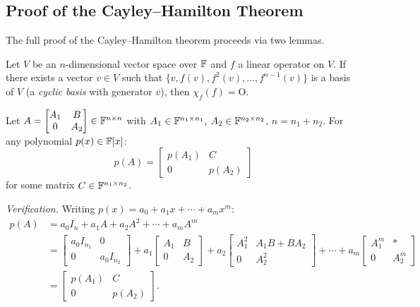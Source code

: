 \subsection{Proof of the Cayley--Hamilton Theorem}

The full proof of the Cayley--Hamilton theorem proceeds via two lemmas.

\begin{thmbox}
\label{lem:cyclic-basis-ch}
Let $V$ be an $n$-dimensional vector space over $\mathbb{F}$ and $f$ a linear
operator on $V$.  If there exists a vector $v\in V$ such that
$\{v, f(v), f^2(v), \ldots, f^{n-1}(v)\}$ is a basis of $V$
(a \emph{cyclic basis} with generator $v$), then $\chi_f(f)=\mathrm{O}$.
\end{thmbox}

\begin{tipbox}
\label{rem:block-poly}
Let
$A=\begin{bmatrix}A_1&B\\0&A_2\end{bmatrix}\in\mathbb{F}^{n\times n}$
with $A_1\in\mathbb{F}^{n_1\times n_1}$, $A_2\in\mathbb{F}^{n_2\times n_2}$,
$n=n_1+n_2$.  For any polynomial $p(x)\in\mathbb{F}[x]$:
\[
    p(A) = \begin{bmatrix}p(A_1)&C\\0&p(A_2)\end{bmatrix}
\]
for some matrix $C\in\mathbb{F}^{n_1\times n_2}$.

\medskip\noindent
\emph{Verification.}  Writing $p(x)=a_0+a_1 x+\cdots+a_m x^m$:
\begin{align*}
    p(A)
    &= a_0 I_n + a_1 A + a_2 A^2 + \cdots + a_m A^m \\
    &= \begin{bmatrix}a_0 I_{n_1}&0\\0&a_0 I_{n_2}\end{bmatrix}
     + a_1\begin{bmatrix}A_1&B\\0&A_2\end{bmatrix}
     + a_2\begin{bmatrix}A_1^2&A_1 B+BA_2\\0&A_2^2\end{bmatrix}
     + \cdots
     + a_m\begin{bmatrix}A_1^m&*\\0&A_2^m\end{bmatrix} \\
    &= \begin{bmatrix}p(A_1)&C\\0&p(A_2)\end{bmatrix}.
\end{align*}
\end{tipbox}


